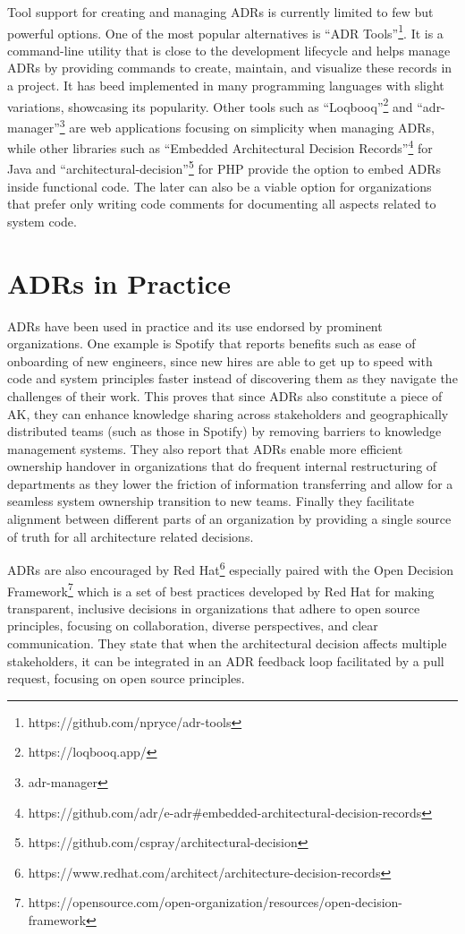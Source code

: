         Tool support for creating and managing ADRs is currently limited to few but powerful options. One of the most popular alternatives is ``ADR Tools''\footnote{https://github.com/npryce/adr-tools}. It is a command-line utility that is close to the development lifecycle and helps manage ADRs by providing commands to create, maintain, and visualize these records in a project. It has beed implemented in many programming languages with slight variations, showcasing its popularity. Other tools such as ``Loqbooq''\footnote{https://loqbooq.app/} and ``adr-manager''\footnote{adr-manager} are web applications focusing on simplicity when managing ADRs, while other libraries such as ``Embedded Architectural Decision Records''\footnote{https://github.com/adr/e-adr\#embedded-architectural-decision-records} for Java and ``architectural-decision''\footnote{https://github.com/cspray/architectural-decision} for PHP provide the option to embed ADRs inside functional code. The later can also be a viable option for organizations that prefer only writing code comments for documenting all aspects related to system code.

    \newpage
    \section{ADRs in Practice}
        ADRs have been used in practice and its use endorsed by prominent organizations. One example is Spotify \cite{Spotify_ADRS} that reports benefits such as ease of onboarding of new engineers, since new hires are able to get up to speed with code and system principles faster instead of discovering them as they navigate the challenges of their work. This proves that since ADRs also constitute a piece of AK, they can enhance knowledge sharing across stakeholders and geographically distributed teams (such as those in Spotify) \cite{AK_management} by removing barriers to knowledge management systems. They also report that ADRs enable more efficient ownership handover in organizations that do frequent internal restructuring of departments as they lower the friction of information transferring and allow for a seamless system ownership transition to new teams. Finally they facilitate alignment between different parts of an organization by providing a single source of truth for all architecture related decisions.

        ADRs are also encouraged by Red Hat\footnote{https://www.redhat.com/architect/architecture-decision-records} especially paired with the Open Decision Framework\footnote{https://opensource.com/open-organization/resources/open-decision-framework} which is a set of best practices developed by Red Hat for making transparent, inclusive decisions in organizations that adhere to open source principles, focusing on collaboration, diverse perspectives, and clear communication. They state that when the architectural decision affects multiple stakeholders, it can be integrated in an ADR feedback loop facilitated by a pull request, focusing on open source principles.  


